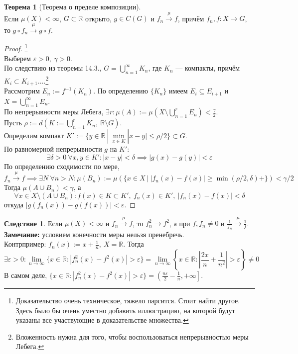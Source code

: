 \documentclass[11pt,a4paper]{report}
\def\eps{\varepsilon}
\def\Real{\mathbb{R}}
\theoremstyle{definition}
\theoremstyle{definition}
\newtheorem{theorem}{Теорема}[section]
\newtheorem{corollary}{Следствие}[section]
\theoremstyle{definition}
\begin{document}
		\begin{theorem}[Теорема о пределе композиции]$  $\\
			Если $ \mu(X) < \infty $, $ G \subset \Real $ открыто, $ g \in C(G) $ и $ f_{n} \xrightarrow{\mu} f$, причём $ f_{n}, f: X \to G $, то $ g \circ f_{n} \xrightarrow{\mu} g \circ f $.
		\end{theorem}
		\begin{proof}\footnote{Доказательство очень техническое, тяжело парсится. Стоит найти другое. Здесь было бы очень уместно добавить иллюстрацию, на которой будут указаны все участвующие в доказательстве множества.}$  $\\
			Выберем $ \eps > 0,\ \gamma > 0 $.\\
			По следствию из теоремы 14.3., $ G = \bigcup\limits_{n=1}^{\infty}{K_{n}} $, где $ K_{n} $ — компакты, причём $ K_{i} \subset K_{i+1}\dots $.\footnote{Вложенность нужна для того, чтобы воспользоваться непрерывностью меры Лебега.}\\
			Рассмотрим $ E_{n} := f^{-1}(K_{n}) $. По определению $ \{K_{n}\} $ имеем $ E_{i} \subseteq E_{i+1}  $ и $ X = \bigcup\limits_{n=1}^{\infty}{ E_{n} } $.\\
			По непрерывности меры Лебега, $ \exists r: \mu(A) := \mu\left (X \setminus \bigcup\limits_{n=1}^{r} E_{n}\right ) < \frac{\gamma}{2} $.\\
			Пусть $ \rho := d\left (K := \bigcup\limits_{n=1}^{r} K_{n},\ \Real \setminus G\right ) $.\\
			Определим компакт $ K' := \{y \in \Real\ |\ \min\limits_{x \in K} |x - y| \le \rho/2 \} \subset G $.\\
			По равномерной непрерывности $ g $ на $ K' $: 
			\[ \exists \delta > 0\ \forall x, y \in K': |x - y| < \delta \implies |g(x) - g(y)| < \eps \]
			По определению сходимости по мере,
			\[ f_{n} \xrightarrow{\mu} f \implies \exists N\ \forall n > N: \mu(B_{n}) := \mu(\{ x \in X\ |\ |f_{n}(x) - f(x)| \ge \min(\rho/2, \delta)+ \}) < \gamma/2 \]
			Тогда $ \mu(A \cup B_{n}) < \gamma $, а 
			\[ \forall x \in X \setminus (A \cup B_{n}): f(x) \in K \subset K',\ f_{n}(x) \in K',\ |f_{n}(x) - f(x)| < \delta \] откуда $ |g(f_{n}(x)) - g(f(x))| < \eps $.
		\end{proof}
		\begin{corollary}
			Если $ \mu(X) < \infty $ и $ f_{n} \xrightarrow{\mu} f $, то $ f^{2}_{n} \to f^{2} $, а при $ f, f_{n} \neq 0 $ и $ \frac{1}{f_{n}} \xrightarrow{\mu} \frac{1}{f} $.\\
			\textbf{Замечание:} условием конечности меры нельзя пренебречь.\\
			Контрпример: $ f_{n}(x) := x + \frac{1}{n},\ X = \Real $. Тогда 
			\[ \exists \eps > 0: \lim\limits_{n\to\infty}\{ x \in \Real: |f^{2}_{n}(x) - f^{2}(x)| > \eps \} = \lim\limits_{n\to\infty}\left \{ x \in \Real: \left |\frac{2x}{n} + \frac{1}{n^2}\right | > \eps \right \} \neq 0 \]
			В самом деле, $ \{ x \in \Real: |f^{2}_{n}(x) - f^{2}(x)| > \eps \} = \left (\frac{n \eps}{2} - \frac{1}{n}, +\infty\right ] $.
		\end{corollary}
\end{document}
